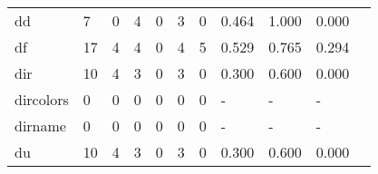 \begin{longtable}{lp{1.2cm}p{1.2cm}p{1.2cm}p{1.2cm}p{1.2cm}p{1.2cm}p{1.2cm}p{1.2cm}p{1.2cm}p{1.2cm}}
dd        &                                     7 &                                                  0 &                                                4 &                                               0 &                                                3 &                                              0 &                                         0.464 &                                              1.000 &                                              0.000 \\
df        &                                    17 &                                                  4 &                                                4 &                                               0 &                                                4 &                                              5 &                                         0.529 &                                              0.765 &                                              0.294 \\
dir       &                                    10 &                                                  4 &                                                3 &                                               0 &                                                3 &                                              0 &                                         0.300 &                                              0.600 &                                              0.000 \\
dircolors &                                     0 &                                                  0 &                                                0 &                                               0 &                                                0 &                                              0 &                                             - &                                                  - &                                                  - \\
dirname   &                                     0 &                                                  0 &                                                0 &                                               0 &                                                0 &                                              0 &                                             - &                                                  - &                                                  - \\
du        &                                    10 &                                                  4 &                                                3 &                                               0 &                                                3 &                                              0 &                                         0.300 &                                              0.600 &                                              0.000 \\

\end{longtable}
